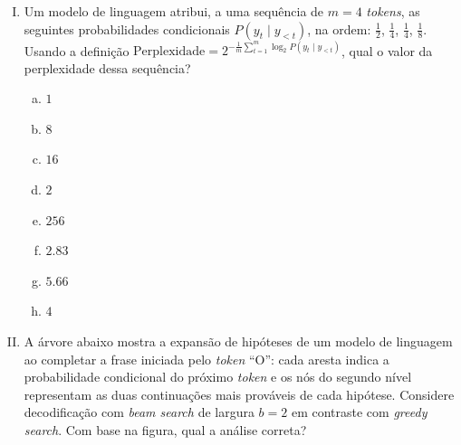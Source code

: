 \documentclass{dlproblemset}
\begin{document}
\begin{enumerate}[I)]
\begin{enumerate}[a)]
    \item $-0.30$.
    \item $-0.60$.
    \item $-1.20$.
    \item $-2.40$.
\end{enumerate}

\item Um modelo de linguagem atribui, a uma sequência de $m = 4$ \textit{tokens}, as seguintes probabilidades condicionais $P(y_t \mid y_{<t})$, na ordem: $\tfrac{1}{2}$, $\tfrac{1}{4}$, $\tfrac{1}{4}$, $\tfrac{1}{8}$. Usando a definição $\text{Perplexidade} = 2^{-\frac{1}{m}\sum_{t=1}^{m}\log_2 P(y_t \mid y_{<t})}$, qual o valor da perplexidade dessa sequência?

\begin{enumerate}[a)]
    \item $1$
    \item $8$
    \item $16$
    \item $2$
    \item $256$
    \item $2.83$
    \item $5.66$
    \item $4$
\end{enumerate}

\item A árvore abaixo mostra a expansão de hipóteses de um modelo de linguagem ao completar a frase iniciada pelo \textit{token} ``O'': cada aresta indica a probabilidade condicional do próximo \textit{token} e os nós do segundo nível representam as duas continuações mais prováveis de cada hipótese. Considere decodificação com \textit{beam search} de largura $b = 2$ em contraste com \textit{greedy search}. Com base na figura, qual a análise correta?


\end{enumerate}
\end{document}
